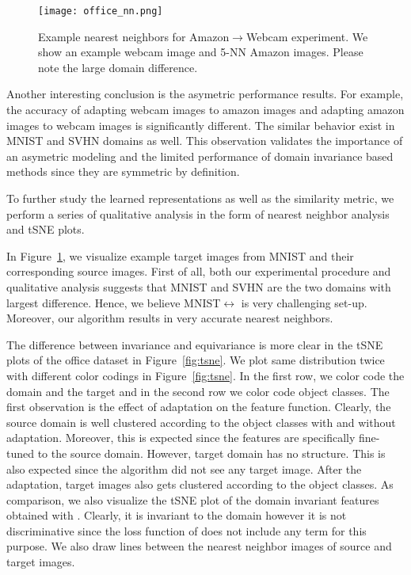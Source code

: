 \begin{figure}[ht]
\texttt{[image: office\_nn.png]}
\caption{Example nearest neighbors for Amazon$\rightarrow$Webcam experiment. We show an example webcam image and 5-NN Amazon images. Please note the large domain difference.}
\label{fig:nn}
\end{figure}


Another interesting conclusion is the asymetric performance results. For example, the accuracy of adapting webcam images to amazon images and adapting amazon images to webcam images is significantly different. The similar behavior exist in MNIST and SVHN domains as well. This observation validates the importance of an asymetric modeling and the limited performance of domain invariance based methods since they are symmetric by definition. 

To further study the learned representations as well as the similarity metric, we perform a series of qualitative analysis in the form of nearest neighbor analysis and tSNE\cite{tsne} plots.

In Figure~\ref{fig:nn}, we visualize example target images from MNIST and their corresponding source images. First of all, both our experimental procedure and qualitative analysis suggests that MNIST and SVHN are the two domains with largest difference. Hence, we believe MNIST$\leftrightarrow$ is very challenging set-up. Moreover, our algorithm results in very accurate nearest neighbors.

The difference between invariance and equivariance is more clear in the tSNE plots of the office dataset in Figure~\ref{fig:tsne}. We plot same distribution twice with different color codings in Figure~\ref{fig:tsne}. In the first row, we color code the domain and the target and in the second row we color code object classes. The first observation is the effect of adaptation on the feature function. Clearly, the source domain is well clustered according to the object classes with and without adaptation. Moreover, this is expected since the features are specifically fine-tuned to the source domain. However, target domain has no structure. This is also expected since the algorithm did not see any target image. After the adaptation, target images also gets clustered according to the object classes. As comparison, we also visualize the tSNE plot of the domain invariant features obtained with \cite{ganin15}. Clearly, it is invariant to the domain however it is not discriminative since the loss function of \cite{ganin15} does not include any term for this purpose. We also draw lines between the nearest neighbor images of source and target images. 

